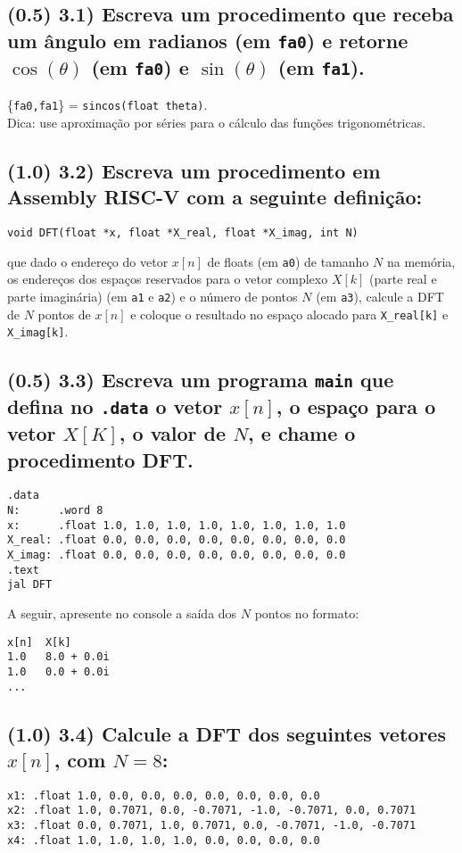 \documentclass[12pt,a4paper]{article}
\begin{document}
\subsection*{(0.5) 3.1) Escreva um procedimento que receba um ângulo em radianos (em \texttt{fa0}) e retorne $\cos(\theta)$ (em \texttt{fa0}) e $\sin(\theta)$ (em \texttt{fa1}).}
\{\texttt{fa0,fa1}\} = \texttt{sincos(float theta)}. \\
Dica: use aproximação por séries para o cálculo das funções trigonométricas.

\subsection*{(1.0) 3.2) Escreva um procedimento em Assembly RISC-V com a seguinte definição:}
\begin{verbatim}
void DFT(float *x, float *X_real, float *X_imag, int N)
\end{verbatim}
que dado o endereço do vetor $x[n]$ de floats (em \texttt{a0}) de tamanho $N$ na memória, os endereços dos espaços reservados para o vetor complexo $X[k]$ (parte real e parte imaginária) (em \texttt{a1} e \texttt{a2}) e o número de pontos $N$ (em \texttt{a3}), calcule a DFT de $N$ pontos de $x[n]$ e coloque o resultado no espaço alocado para \texttt{X\_real[k]} e \texttt{X\_imag[k]}.

\subsection*{(0.5) 3.3) Escreva um programa \texttt{main} que defina no \texttt{.data} o vetor $x[n]$, o espaço para o vetor $X[K]$, o valor de $N$, e chame o procedimento DFT.}
\begin{verbatim}
.data
N:      .word 8
x:      .float 1.0, 1.0, 1.0, 1.0, 1.0, 1.0, 1.0, 1.0
X_real: .float 0.0, 0.0, 0.0, 0.0, 0.0, 0.0, 0.0, 0.0
X_imag: .float 0.0, 0.0, 0.0, 0.0, 0.0, 0.0, 0.0, 0.0
.text
jal DFT
\end{verbatim}
A seguir, apresente no console a saída dos $N$ pontos no formato:
\begin{verbatim}
x[n]  X[k]
1.0   8.0 + 0.0i
1.0   0.0 + 0.0i
...
\end{verbatim}

\subsection*{(1.0) 3.4) Calcule a DFT dos seguintes vetores $x[n]$, com $N=8$:}
\begin{verbatim}
x1: .float 1.0, 0.0, 0.0, 0.0, 0.0, 0.0, 0.0, 0.0
x2: .float 1.0, 0.7071, 0.0, -0.7071, -1.0, -0.7071, 0.0, 0.7071
x3: .float 0.0, 0.7071, 1.0, 0.7071, 0.0, -0.7071, -1.0, -0.7071
x4: .float 1.0, 1.0, 1.0, 1.0, 0.0, 0.0, 0.0, 0.0
\end{verbatim}
\end{document}
